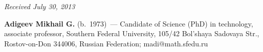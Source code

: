 \vspace*{-6pt}

\hfill{\small\textit{Received July 30, 2013}}

\vspace*{-18pt}

\Contrl

\noindent
\textbf{Adigeev Mikhail G.} (b.\ 1973)~---
Candidate of Science (PhD) in technology, associate professor,
Southern Federal University, 105/42 Bol'shaya Sadovaya Str., Rostov-on-Don 344006,
Russian Federation; madi@math.sfedu.ru

 \label{end\stat}

\renewcommand{\bibname}{\protect\rm Литература}